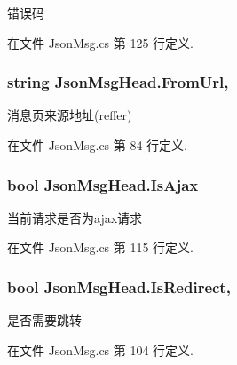 错误码 



在文件 Json\-Msg.\-cs 第 125 行定义.

\hypertarget{class_json_msg_head_a54e392cc544783fd8f6eff683837efeb}{
\subsubsection[{From\-Url}]{\setlength{\rightskip}{0pt plus 5cm}string Json\-Msg\-Head.\-From\-Url\hspace{0.3cm}{\ttfamily [get]}, {\ttfamily [set]}}}\label{class_json_msg_head_a54e392cc544783fd8f6eff683837efeb}


消息页来源地址(reffer) 



在文件 Json\-Msg.\-cs 第 84 行定义.

\hypertarget{class_json_msg_head_abdfd31cd1c4bcbca50b1afc5e57c95d8}{
\subsubsection[{Is\-Ajax}]{\setlength{\rightskip}{0pt plus 5cm}bool Json\-Msg\-Head.\-Is\-Ajax\hspace{0.3cm}{\ttfamily [get]}}}\label{class_json_msg_head_abdfd31cd1c4bcbca50b1afc5e57c95d8}


当前请求是否为ajax请求 



在文件 Json\-Msg.\-cs 第 115 行定义.

\hypertarget{class_json_msg_head_a6be740681187896f1f1924cc07ca544e}{
\subsubsection[{Is\-Redirect}]{\setlength{\rightskip}{0pt plus 5cm}bool Json\-Msg\-Head.\-Is\-Redirect\hspace{0.3cm}{\ttfamily [get]}, {\ttfamily [set]}}}\label{class_json_msg_head_a6be740681187896f1f1924cc07ca544e}


是否需要跳转 



在文件 Json\-Msg.\-cs 第 104 行定义.

